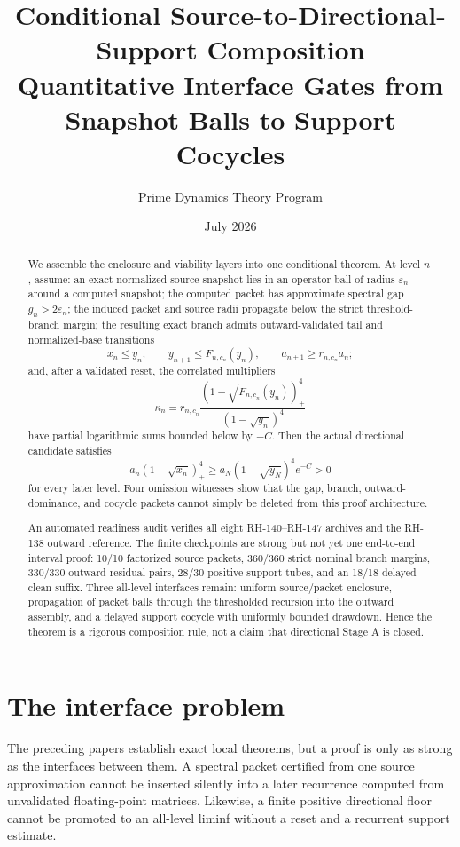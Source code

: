 \documentclass[12pt]{article}
\title{Conditional Source-to-Directional-Support Composition\\\large Quantitative Interface Gates from Snapshot Balls to Support Cocycles}
\author{Prime Dynamics Theory Program}
\date{July 2026}
\begin{document}
\maketitle

\begin{abstract}
We assemble the enclosure and viability layers into one conditional theorem.
At level $n$, assume: an exact normalized source snapshot lies in an operator
ball of radius $\varepsilon_n$ around a computed snapshot; the computed
packet has approximate spectral gap $g_n>2\varepsilon_n$; the induced packet
and source radii propagate below the strict threshold-branch margin; the
resulting exact branch admits outward-validated tail and normalized-base
transitions
\[
 x_n\leq y_n,
 \qquad y_{n+1}\leq F_{n,c_n}(y_n),
 \qquad a_{n+1}\geq r_{n,c_n}a_n;
\]
and, after a validated reset, the correlated multipliers
\[
 \kappa_n=r_{n,c_n}
 \frac{(1-\sqrt{F_{n,c_n}(y_n)})_+^4}{(1-\sqrt{y_n})^4}
\]
have partial logarithmic sums bounded below by $-C$.  Then the actual
directional candidate satisfies
\[
 a_n(1-\sqrt{x_n})_+^4\geq
 a_N(1-\sqrt{y_N})^4e^{-C}>0
\]
for every later level.  Four omission witnesses show that the gap, branch,
outward-dominance, and cocycle packets cannot simply be deleted from this
proof architecture.

An automated readiness audit verifies all eight RH-140--RH-147 archives and
the RH-138 outward reference.  The finite checkpoints are strong but not yet
one end-to-end interval proof: 10/10 factorized source packets, 360/360 strict
nominal branch margins, 330/330 outward residual pairs, 28/30 positive support
tubes, and an 18/18 delayed clean suffix.  Three all-level interfaces remain:
uniform source/packet enclosure, propagation of packet balls through the
thresholded recursion into the outward assembly, and a delayed support
cocycle with uniformly bounded drawdown.  Hence the theorem is a rigorous
composition rule, not a claim that directional Stage A is closed.
\end{abstract}

\section{The interface problem}
The preceding papers establish exact local theorems, but a proof is only as
strong as the interfaces between them.  A spectral packet certified from one
source approximation cannot be inserted silently into a later recurrence
computed from unvalidated floating-point matrices.  Likewise, a finite
positive directional floor cannot be promoted to an all-level liminf without
a reset and a recurrent support estimate.
\end{document}

